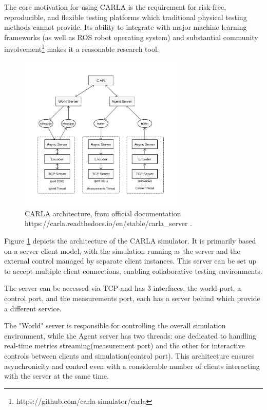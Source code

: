 The core motivation for using CARLA is the requirement for risk-free, reproducible, and flexible testing platforms which traditional physical testing methods cannot provide. Its ability to integrate with major machine learning frameworks (as well as ROS robot operating system) and substantial community involvement\footnote{https://github.com/carla-simulator/carla} makes it a reasonable research tool.

\begin{figure} [!ht]
    \centering
    \includegraphics[width=0.70\textwidth]{parts/figuras/carla_architecture.pdf}
    \caption{CARLA architecture, from official documentation https://carla.readthedocs.io/en/stable/carla\_server .}
    \label{fig:carla_architecture}
\end{figure}

Figure \ref{fig:carla_architecture} depicts the architecture of the CARLA simulator. It is primarily based on a server-client model, with the simulation running as the server and the external control managed by separate client instances. This server can be set up to accept multiple client connections, enabling collaborative testing environments.

The server can be accessed via TCP and has 3 interfaces, the world port, a control port, and the measurements port, each has a server behind which provide a different service.

The "World" server is responsible for controlling the overall simulation environment, while the Agent server has two threads: one dedicated to handling real-time metrics streaming(measurement port) and the other for interactive controls between clients and simulation(control port). This architecture ensures asynchronicity and control even with a considerable number of clients interacting with the server at the same time.

